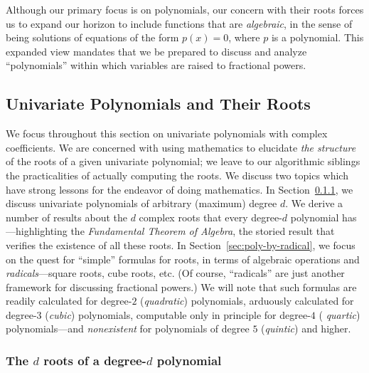 \bigskip

 
Although our primary focus is on polynomials, our concern with their
roots forces us to expand our horizon to include functions that are
{\it algebraic}, in the sense of being solutions of equations of the
form $p(x) = 0$, where $p$ is a polynomial.  This expanded view
mandates that we be prepared to discuss and analyze ``polynomials''
within which variables are raised to fractional powers.


\subsection{Univariate Polynomials and Their Roots}
\label{sec:univariate-polynomials}

We focus throughout this section on univariate polynomials with
complex coefficients.  We are concerned with using mathematics to
elucidate {\em the structure} of the roots of a given univariate
polynomial; we leave to our algorithmic siblings the practicalities of
actually computing the roots.  We discuss two topics which have strong
lessons for the endeavor of doing mathematics.  In
Section~\ref{sec:fund-thm-algebra}, we discuss univariate polynomials
of arbitrary (maximum) degree $d$.  We derive a number of results
about the $d$ complex roots that every degree-$d$ polynomial
has---highlighting the {\it Fundamental Theorem of Algebra}, the
storied result that verifies the existence of all these roots.  In
Section~\ref{sec:poly-by-radical}, we focus on the quest for
``simple'' formulas for roots, in terms of algebraic operations and
 {\it radicals}---square roots, cube roots, etc.  (Of
course, ``radicals'' are just another framework for discussing
fractional powers.)  We will note that such formulas are readily
calculated for degree-$2$ ({\it quadratic}) polynomials,
 
arduously calculated for degree-$3$
({\it cubic}) 
polynomials, computable only in principle for degree-$4$ ({\it
  quartic}) 
polynomials---and {\em nonexistent} for polynomials of degree $5$
({\it quintic})
and higher.

\subsubsection{The $d$ roots of a degree-$d$ polynomial}
\label{sec:fund-thm-algebra}

